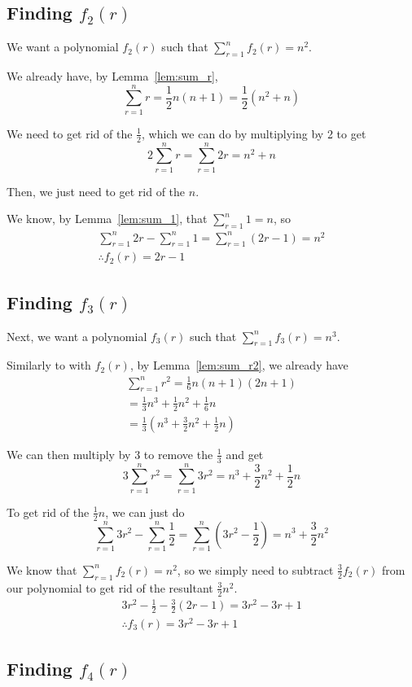 \documentclass[a4paper]{article}
\newcommand{\sn}{\sum\limits_{r=1}^{n}}
\newcommand{\oo}[1]{\frac{1}{#1}}
\begin{document}
\subsection{Finding $f_2(r)$}
We want a polynomial $f_2(r)$ such that $\sn f_2(r) = n^2$.

We already have, by Lemma~\ref{lem:sum_r}, $$\sn r = \oo{2}n(n + 1) = \oo{2}\left(n^2 + n\right)$$

We need to get rid of the $\oo{2}$, which we can do by multiplying by 2 to get $$2 \sn r = \sn 2r = n^2 + n$$

Then, we just need to get rid of the $n$.

We know, by Lemma~\ref{lem:sum_1}, that $\sn 1 = n$, so
\begin{gather*}
\sn 2r - \sn 1 = \sn (2r - 1) = n^2\\
\therefore f_2(r) = 2r - 1
\end{gather*}

\subsection{Finding $f_3(r)$}

Next, we want a polynomial $f_3(r)$ such that $\sn f_3(r) = n^3$.

Similarly to with $f_2(r)$, by Lemma~\ref{lem:sum_r2}, we already have
\begin{gather*}
\sn r^2 = \oo{6}n(n + 1)(2n + 1)\\
= \oo{3}n^3 + \oo{2}n^2 + \oo{6}n\\[0.2em]
= \oo{3}\left(n^3 + \frac{3}{2}n^2 + \oo{2}n\right)
\end{gather*}

We can then multiply by $3$ to remove the $\oo{3}$ and get $$3 \sn r^2 = \sn 3r^2 = n^3 + \frac{3}{2}n^2 + \oo{2}n$$

To get rid of the $\oo{2}n$, we can just do $$\sn 3r^2 - \sn \oo{2} = \sn \left(3r^2 - \oo{2}\right) = n^3 + \frac{3}{2}n^2$$

We know that $\sn f_2(r) = n^2$, so we simply need to subtract $\frac{3}{2}f_2(r)$ from our polynomial to get rid of the resultant $\frac{3}{2}n^2$.
\begin{gather*}
3r^2 - \oo{2} - \frac{3}{2}(2r - 1) = 3r^2 - 3r + 1\\
\therefore f_3(r) = 3r^2 - 3r + 1
\end{gather*}

\subsection{Finding $f_4(r)$}
\end{document}
